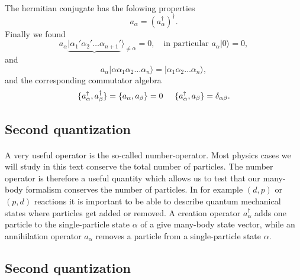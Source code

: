 \documentclass[%
twoside,                 %
final,                   %
10pt]{article}
\begin{document}
\paragraph{}
The hermitian conjugate has the folowing properties
\[
        a_{\alpha} = ( a_{\alpha}^{\dagger} )^{\dagger}.
\]
Finally we found 
\[
	a_\alpha\underbrace{|\alpha_1'\alpha_2' \dots \alpha_{n+1}'}\rangle_{\neq \alpha} = 0, \quad
		\textrm{in particular } a_\alpha |0\rangle = 0,
\]
and
\[
 a_\alpha |\alpha\alpha_1\alpha_2 \dots \alpha_{n}\rangle = |\alpha_1\alpha_2 \dots \alpha_{n}\rangle,
\]
and the corresponding commutator algebra
\[
	\{a_{\alpha}^{\dagger},a_{\beta}^{\dagger}\} = \{a_{\alpha},a_{\beta}\} = 0 \hspace{0.5cm} 
\{a_\alpha^{\dagger},a_\beta \} = \delta_{\alpha\beta}.
\]




\subsection*{Second quantization}

\paragraph{}
A very useful operator is the so-called number-operator.  Most physics cases  we will
study in this text conserve the total number of particles.  The number operator is therefore
a useful quantity which allows us to test that our many-body formalism  conserves the number of particles.
In for example $(d,p)$ or $(p,d)$ reactions it is important to be able to describe quantum mechanical states
where particles get added or removed.
A creation operator $a_\alpha^{\dagger}$ adds one particle to the single-particle state
$\alpha$ of a give many-body state vector, while an annihilation operator $a_\alpha$ 
removes a particle from a single-particle
state $\alpha$.





\subsection*{Second quantization}

\end{document}
